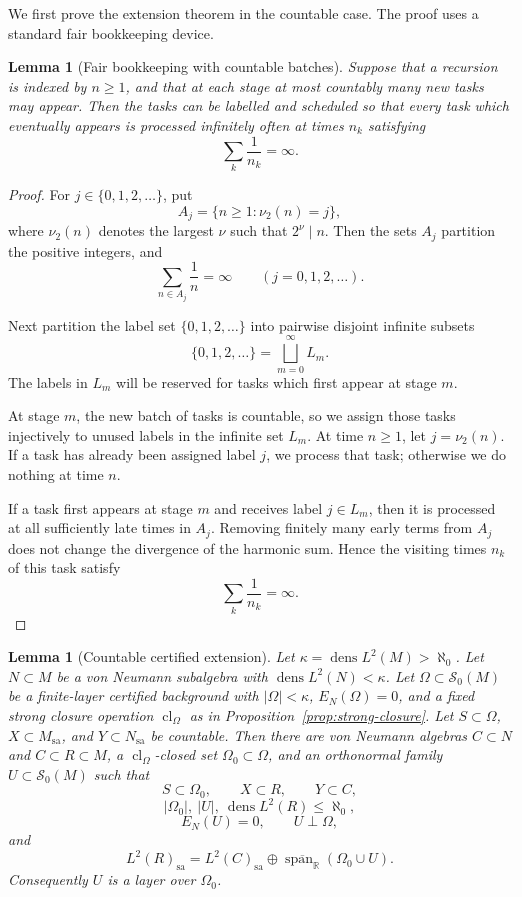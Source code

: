 \documentclass[11pt,letterpaper,reqno]{amsart}
\newtheorem{lem}[thm]{Lemma}
\theoremstyle{definition}
\numberwithin{equation}{section}
\newcommand{\sa}{\mathrm{sa}}
\newcommand{\RR}{\mathbb R}
\newcommand{\cl}{\operatorname{cl}}
\DeclareMathOperator{\spanop}{span}
\DeclareMathOperator{\dens}{dens}
\begin{document}
We first prove the extension theorem in the countable case.  The proof uses a standard fair bookkeeping device.

\begin{lem}[Fair bookkeeping with countable batches]\label{lem:bookkeeping}
Suppose that a recursion is indexed by \(n\geq1\), and that at each stage
at most countably many new tasks may appear.  Then the tasks can be labelled
and scheduled so that every task which eventually appears is processed
infinitely often at times \(n_k\) satisfying
\[
   \sum_k\frac1{n_k}=\infty .
\]
\end{lem}

\begin{proof}
For \(j\in\{0,1,2,\ldots\}\), put
\[
   A_j=\{n\geq1:\nu_2(n)=j\},
\]
where \(\nu_2(n)\) denotes the largest \(\nu\) such that \(2^\nu \mid n\).
Then the sets \(A_j\) partition the positive integers, and
\[
   \sum_{n\in A_j}\frac1n=\infty
   \qquad(j=0,1,2,\ldots).
\]

Next partition the label set \(\{0,1,2,\ldots\}\) into pairwise disjoint
infinite subsets
\[
   \{0,1,2,\ldots\}=\bigsqcup_{m=0}^\infty L_m .
\]
The labels in \(L_m\) will be reserved for tasks which first appear at stage
\(m\).

At stage \(m\), the new batch of tasks is countable, so we assign those tasks
injectively to unused labels in the infinite set \(L_m\).  At time \(n\geq1\),
let \(j=\nu_2(n)\).  If a task has already been assigned label \(j\), we
process that task; otherwise we do nothing at time \(n\).

If a task first appears at stage \(m\) and receives label \(j\in L_m\), then
it is processed at all sufficiently late times in \(A_j\).  Removing finitely
many early terms from \(A_j\) does not change the divergence of the harmonic
sum.  Hence the visiting times \(n_k\) of this task satisfy
\[
   \sum_k\frac1{n_k}=\infty .
\]
\end{proof}

\begin{lem}[Countable certified extension]\label{lem:countable-extension}
Let $\kappa=\dens L^2(M)>\aleph_0$.  Let $N\subset M$ be a von Neumann subalgebra with $\dens L^2(N)<\kappa$.  Let $\Omega\subset\mathcal S_0(M)$ be a finite-layer certified background with $|\Omega|<\kappa$, $E_N(\Omega)=0$, and a fixed strong closure operation $\cl_\Omega$ as in Proposition~\ref{prop:strong-closure}.  Let $S\subset\Omega$, $X\subset M_{\sa}$, and $Y\subset N_{\sa}$ be countable.  Then there are von Neumann algebras $C\subset N$ and $C\subset R\subset M$, a $\cl_\Omega$-closed set $\Omega_0\subset\Omega$, and an orthonormal family $U\subset\mathcal S_0(M)$ such that
\[
   S\subset\Omega_0,
   \qquad X\subset R,
   \qquad Y\subset C,
\]
\[
   |\Omega_0|,\ |U|,\ \dens L^2(R)\leq\aleph_0,
\]
\[
   E_N(U)=0,
   \qquad U\perp\Omega,
\]
and
\[
   L^2(R)_{\sa}=L^2(C)_{\sa}\oplus\overline{\spanop_{\RR}}(\Omega_0\cup U).
\]
Consequently $U$ is a layer over $\Omega_0$.
\end{lem}
\end{document}
